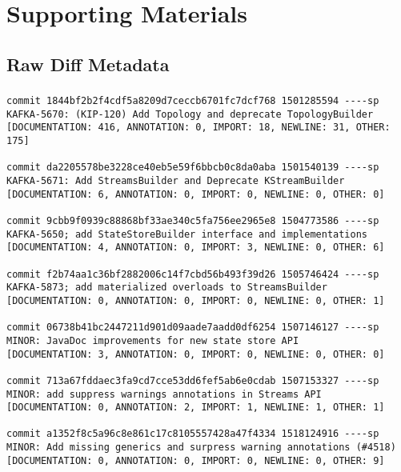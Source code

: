\chapter{Supporting Materials}

\section{Raw Diff Metadata}

\subsection{}
\label{sec:Topology-Diff-Metadata}

\begin{lstlisting}
commit 1844bf2b2f4cdf5a8209d7ceccb6701fc7dcf768 1501285594 ----sp 
KAFKA-5670: (KIP-120) Add Topology and deprecate TopologyBuilder                                     
[DOCUMENTATION: 416, ANNOTATION: 0, IMPORT: 18, NEWLINE: 31, OTHER: 175]

commit da2205578be3228ce40eb5e59f6bbcb0c8da0aba 1501540139 ----sp 
KAFKA-5671: Add StreamsBuilder and Deprecate KStreamBuilder                                          
[DOCUMENTATION: 6, ANNOTATION: 0, IMPORT: 0, NEWLINE: 0, OTHER: 0]

commit 9cbb9f0939c88868bf33ae340c5fa756ee2965e8 1504773586 ----sp 
KAFKA-5650; add StateStoreBuilder interface and implementations                                      
[DOCUMENTATION: 4, ANNOTATION: 0, IMPORT: 3, NEWLINE: 0, OTHER: 6]

commit f2b74aa1c36bf2882006c14f7cbd56b493f39d26 1505746424 ----sp 
KAFKA-5873; add materialized overloads to StreamsBuilder                                             
[DOCUMENTATION: 0, ANNOTATION: 0, IMPORT: 0, NEWLINE: 0, OTHER: 1]

commit 06738b41bc2447211d901d09aade7aadd0df6254 1507146127 ----sp 
MINOR: JavaDoc improvements for new state store API                                                  
[DOCUMENTATION: 3, ANNOTATION: 0, IMPORT: 0, NEWLINE: 0, OTHER: 0]

commit 713a67fddaec3fa9cd7cce53dd6fef5ab6e0cdab 1507153327 ----sp 
MINOR: add suppress warnings annotations in Streams API                                              
[DOCUMENTATION: 0, ANNOTATION: 2, IMPORT: 1, NEWLINE: 1, OTHER: 1]

commit a1352f8c5a96c8e861c17c8105557428a47f4334 1518124916 ----sp 
MINOR: Add missing generics and surpress warning annotations (#4518)                                 
[DOCUMENTATION: 0, ANNOTATION: 0, IMPORT: 0, NEWLINE: 0, OTHER: 9]


\end{lstlisting}
